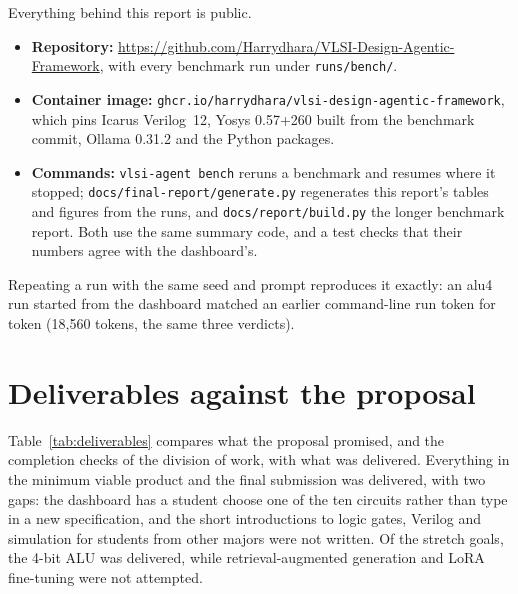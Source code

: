 \documentclass[11pt,a4paper]{article}
\begin{document}
Everything behind this report is public.
\begin{itemize}[itemsep=4pt]\raggedright
  \item \textbf{Repository:} \url{https://github.com/Harrydhara/VLSI-Design-Agentic-Framework}, with every benchmark
        run under \texttt{runs/bench/}.
  \item \textbf{Container image:} \nolinkurl{ghcr.io/harrydhara/vlsi-design-agentic-framework}, which pins Icarus
        Verilog~12, Yosys 0.57+260 built from the benchmark commit, Ollama 0.31.2 and the Python packages.
  \item \textbf{Commands:} \texttt{vlsi-agent bench} reruns a benchmark and resumes where it stopped;
        \nolinkurl{docs/final-report/generate.py} regenerates this report's tables and figures from the runs, and
        \nolinkurl{docs/report/build.py} the longer benchmark report. Both use the same summary code, and a test checks
        that their numbers agree with the dashboard's.
\end{itemize}
Repeating a run with the same seed and prompt reproduces it exactly: an alu4 run started from the dashboard matched an
earlier command-line run token for token (18,560 tokens, the same three verdicts).

\section{Deliverables against the proposal}

Table~\ref{tab:deliverables} compares what the proposal promised, and the completion checks of the division of work,
with what was delivered. Everything in the minimum viable product and the final submission was delivered, with two
gaps: the dashboard has a student choose one of the ten circuits rather than type in a new specification, and the
short introductions to logic gates, Verilog and simulation for students from other majors were not written. Of the
stretch goals, the 4-bit ALU was delivered, while retrieval-augmented generation and LoRA fine-tuning were not
attempted.
\end{document}
